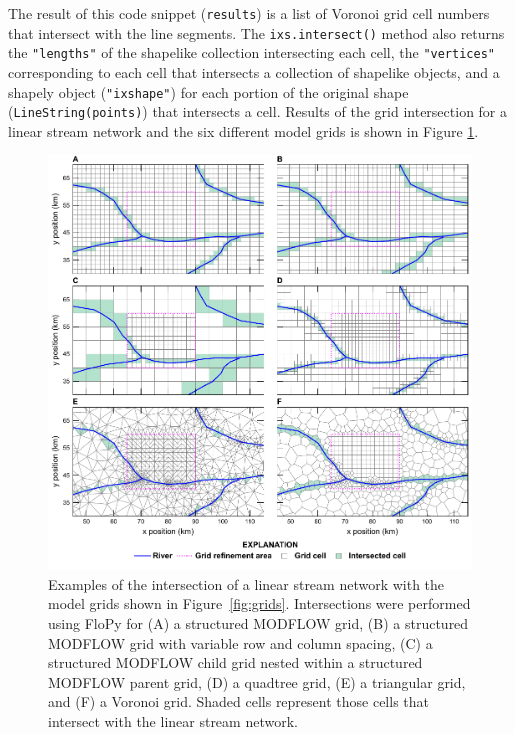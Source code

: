 \documentclass[12pt, oneside]{article}  	%
\begin{document}
\noindent The result of this code snippet (\texttt{results}) is a list of Voronoi grid cell numbers that intersect with the line segments. The \texttt{ixs.intersect()} method also returns the \texttt{"lengths"} of the shapelike collection intersecting each cell, the \texttt{"vertices"} corresponding to each cell that intersects a collection of shapelike objects, and a shapely object (\texttt{"ixshape"}) for each portion of the original shape (\texttt{LineString(points)}) that intersects a cell. Results of the grid intersection for a linear stream network and the six different model grids is shown in Figure \ref{fig:intersections}.

\begin{figure}[ht!]
	\begin{center}
		\includegraphics{figure2.pdf}
	\end{center}
	\caption{Examples of the intersection of a linear stream network with the model grids shown in Figure~\ref{fig:grids}. Intersections were performed using FloPy for (A) a structured MODFLOW grid, (B) a structured MODFLOW grid with variable row and column spacing, (C) a structured MODFLOW child grid nested within a structured MODFLOW parent grid, (D) a quadtree grid, (E) a triangular grid, and (F) a Voronoi grid. Shaded cells represent those cells that intersect with the linear stream network.}
	\label{fig:intersections}
\end{figure}
\end{document}
